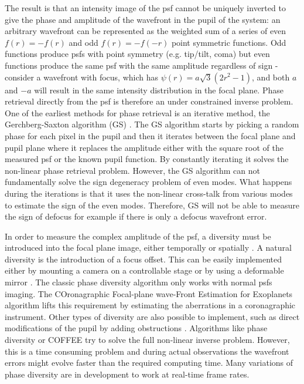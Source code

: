 \documentclass[letterpaper]{ar-1col}
\begin{document}
The result is that an intensity image of the \ac{psf} cannot be uniquely inverted to give the phase and amplitude of the wavefront in the pupil of the system: an arbitrary wavefront can be represented as the weighted sum of a series of even $f(r)=-f(r)$ and odd $f(r)=-f(-r)$ point symmetric functions.
%
Odd functions produce \acp{psf} with point symmetry (e.g. tip/tilt, coma) but even functions produce the same \ac{psf} with the same amplitude regardless of sign - consider a wavefront with focus, which has $\psi(r) = a\sqrt{3}(2r^2-1)$, and both $a$ and $-a$ will result in the same intensity distribution in the focal plane.
%
Phase retrieval directly from the \ac{psf} is therefore an under constrained inverse problem.
%
One of the earliest methods for phase retrieval is an iterative method, the Gerchberg-Saxton algorithm (GS) \citep{Gerchberg72}.
%
The GS algorithm starts by picking a random phase for each pixel in the pupil and then it iterates between the focal plane and pupil plane where it replaces the amplitude either with the square root of the measured \ac{psf} or the known  pupil function.
%
By constantly iterating it solves the non-linear phase retrieval problem.
%
However, the GS algorithm can not fundamentally solve the sign degeneracy problem of even modes.
%
What happens during the iterations is that it uses the non-linear cross-talk from various modes to estimate the sign of the even modes.
%
Therefore, GS will not be able to measure the sign of defocus for example if there is only a defocus wavefront error.

In order to measure the complex amplitude of the \ac{psf}, a diversity must be introduced into the focal plane image, either temporally or spatially \citep[see ][ for a review of these]{Fienup13,Gonsalves14}.
%
A natural diversity is the introduction of a focus offset.
%
This can be easily implemented either by mounting a camera on a controllable stage or by using a deformable mirror \citep{VanGorkom21DMs}.
%
The classic phase diversity algorithm only works with normal \acp{psf} imaging.
%
The COronagraphic Focal-plane wave-Front Estimation for Exoplanets \citep[COFFEE ;][]{Sauvage12,Paul13, herscovici2018experimental} algorithm lifts this requirement by estimating the aberrations in a coronagraphic instrument.
%
Other types of diversity are also possible to implement, such as direct modifications of the pupil by adding obstructions \citep{martinache2013asymmetric, brooks2016polarization, bos2019focal, gerard2023high}.
%
Algorithms like phase diversity or COFFEE try to solve the full non-linear inverse problem.
%
However, this is a time consuming problem and during actual observations the wavefront errors might evolve faster than the required computing time.
%
Many variations of phase diversity are in development to work at real-time frame rates. 
\end{document}
